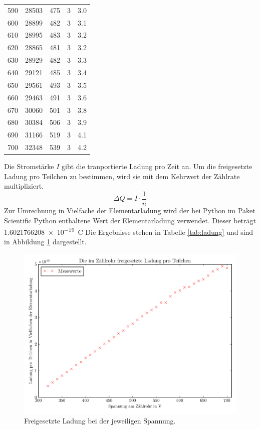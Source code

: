 \documentclass[
  bibliography=totoc,     %
  captions=tableheading,  %
  titlepage=firstiscover, %
]{scrartcl}
\begin{document}
\begin{table}
\begin{tabular}{S[table-format=3.0] S[table-format=5.0] S[table-format=3.0] S[table-format=1.0] S}
    590 & 28503 & 475 & 3 & 3.0 \\
    600 & 28899 & 482 & 3 & 3.1 \\
    610 & 28995 & 483 & 3 & 3.2 \\
    620 & 28865 & 481 & 3 & 3.2 \\
    630 & 28929 & 482 & 3 & 3.3 \\
    640 & 29121 & 485 & 3 & 3.4 \\
    650 & 29561 & 493 & 3 & 3.5 \\
    660 & 29463 & 491 & 3 & 3.6 \\
    670 & 30060 & 501 & 3 & 3.8 \\
    680 & 30384 & 506 & 3 & 3.9 \\
    690 & 31166 & 519 & 3 & 4.1 \\
    700 & 32348 & 539 & 3 & 4.2 \\
    \bottomrule
  \end{tabular}
\end{table}
\clearpage
Die Stromstärke $I$ gibt die tranportierte Ladung pro Zeit an. Um die freigesetzte Ladung
pro Teilchen zu bestimmen, wird sie mit dem Kehrwert der Zählrate multipliziert.
\begin{equation}
  \Delta Q = I \cdot \frac{1}{n}
\end{equation}
Zur Umrechnung in Vielfache der Elementarladung wird der bei Python im Paket Scientific Python
enthaltene Wert der Elementarladung verwendet. Dieser beträgt \SI{1.6021766208e-19}{\coulomb}
Die Ergebnisse stehen in Tabelle \ref{tab:ladung} und sind in Abbildung \ref{fig:plot2} dargestellt.
\begin{figure}
  \centering
  \includegraphics[width=\textwidth]{Plot2.pdf}
  \caption{Freigesetzte Ladung bei der jeweiligen Spannung.}
  \label{fig:plot2}
\end{figure}
\end{document}
